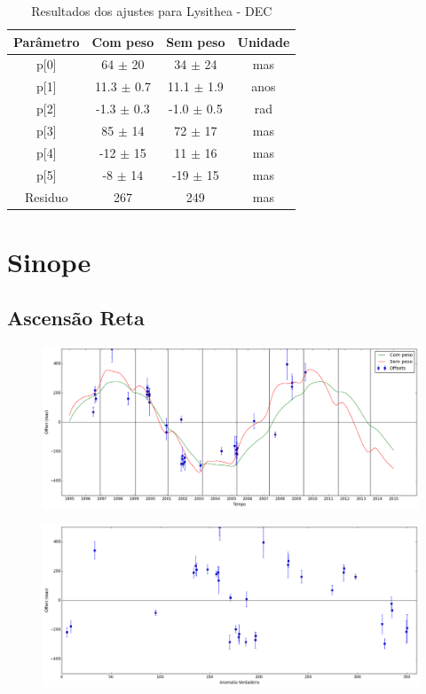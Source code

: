 \documentclass[11pt,a4paper]{report}
\begin{document}
\begin{table}[h!]
\caption{\label{Tab: Lysithea-DEC} Resultados dos ajustes para Lysithea - DEC}
\begin{centering}
\begin{tabular}{cccc}
\hline
\hline
Parâmetro & Com peso & Sem peso & Unidade\tabularnewline
\hline
p[0] & 64 $\pm$ 20 & 34 $\pm$ 24 & mas\\
p[1] & 11.3 $\pm$ 0.7 & 11.1 $\pm$ 1.9 & anos\\
p[2] & -1.3 $\pm$ 0.3 & -1.0 $\pm$ 0.5 & rad\\
p[3] & 85 $\pm$ 14 & 72 $\pm$ 17 & mas\\
p[4] & -12 $\pm$ 15 & 11 $\pm$ 16 & mas\\
p[5] & -8 $\pm$ 14 & -19 $\pm$ 15 & mas\\
Residuo & 267 & 249 & mas\\
\hline 
\end{tabular} 
\par\end{centering}
\end{table}

\chapter*{Sinope}
\section*{Ascensão Reta}

\begin{figure}[h]
\includegraphics[scale=0.35]{Sinope/RA.png} 
\end{figure}

\begin{figure}[h]
\includegraphics[scale=0.35]{Sinope/RA_anom.png}  
\end{figure}
\end{document}
